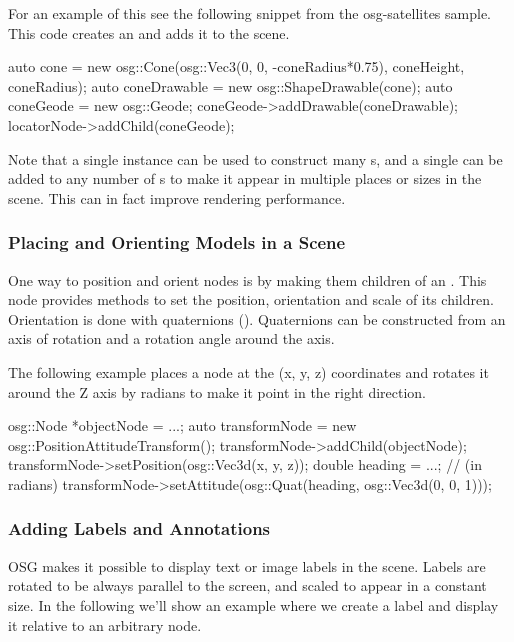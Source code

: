 For an example of this see the following snippet from the osg-satellites
sample. This code creates an  and adds it to the scene.

\begin{cpp}
auto cone = new osg::Cone(osg::Vec3(0, 0, -coneRadius*0.75),
                          coneHeight, coneRadius);
auto coneDrawable = new osg::ShapeDrawable(cone);
auto coneGeode = new osg::Geode;
coneGeode->addDrawable(coneDrawable);
locatorNode->addChild(coneGeode);
\end{cpp}

Note that a single  instance can be used to construct many
s, and a single  can be
added to any number of s to make it appear in multiple
places or sizes in the scene. This can in fact improve rendering performance.

\subsubsection{Placing and Orienting Models in a Scene}

One way to position and orient nodes is by making them children of an
. This node provides methods to
set the position, orientation and scale of its children. Orientation is done
with quaternions (). Quaternions can be constructed from
an axis of rotation and a rotation angle around the axis.

The following example places a node at the (x, y, z) coordinates and rotates it
around the Z axis by  radians to make it point in the right
direction.

\begin{cpp}
osg::Node *objectNode = ...;
auto transformNode = new osg::PositionAttitudeTransform();
transformNode->addChild(objectNode);
transformNode->setPosition(osg::Vec3d(x, y, z));
double heading = ...; // (in radians)
transformNode->setAttitude(osg::Quat(heading, osg::Vec3d(0, 0, 1)));
\end{cpp}

\subsubsection{Adding Labels and Annotations}

OSG makes it possible to display text or image labels in the scene. Labels
are rotated to be always parallel to the screen, and scaled to appear in a
constant size. In the following we'll show an example where we create
a label and display it relative to an arbitrary node.

